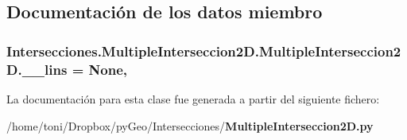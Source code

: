 \subsection{Documentación de los datos miembro}
\subsubsection[{\-\_\-\-\_\-lins}]{\setlength{\rightskip}{0pt plus 5cm}Intersecciones.\-Multiple\-Interseccion2\-D.\-Multiple\-Interseccion2\-D.\-\_\-\-\_\-lins = None\hspace{0.3cm}{\ttfamily [static]}, {\ttfamily [private]}}\label{classIntersecciones_1_1MultipleInterseccion2D_1_1MultipleInterseccion2D_aa59596d2a99dba9927d33b8c19e39650}


La documentación para esta clase fue generada a partir del siguiente fichero\-:\begin{DoxyCompactItemize}
\item 
/home/toni/\-Dropbox/py\-Geo/\-Intersecciones/{\bf Multiple\-Interseccion2\-D.\-py}\end{DoxyCompactItemize}
